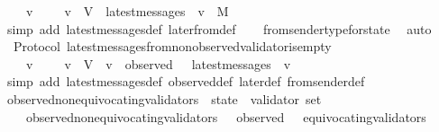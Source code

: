 \begin{isabellebody}
\ \ {\isachardoublequoteopen}{\isasymforall}\ {\isasymsigma}\ v{\isachardot}\ {\isasymsigma}\ {\isasymin}\ {\isasymSigma}\ {\isasymand}\ v\ {\isasymin}\ V\ {\isasymlongrightarrow}\ latest{\isacharunderscore}messages\ {\isasymsigma}\ v\ {\isasymsubseteq}\ M{\isachardoublequoteclose}\isanewline
%
\isadelimproof
\ \ %
\endisadelimproof
%
\isatagproof
{}\isamarkupfalse%
\ {\isacharparenleft}simp\ add{\isacharcolon}\ latest{\isacharunderscore}messages{\isacharunderscore}def\ later{\isacharunderscore}from{\isacharunderscore}def{\isacharparenright}\isanewline
\ \ \isamarkupfalse%
\ from{\isacharunderscore}sender{\isacharunderscore}type{\isacharunderscore}for{\isacharunderscore}state\ \isamarkupfalse%
\ auto%
\endisatagproof
{\isafoldproof}%
%
\isadelimproof
\isanewline
%
\endisadelimproof
\isanewline
{}\isamarkupfalse%
\ {\isacharparenleft}\ Protocol{\isacharparenright}\ latest{\isacharunderscore}messages{\isacharunderscore}from{\isacharunderscore}non{\isacharunderscore}observed{\isacharunderscore}validator{\isacharunderscore}is{\isacharunderscore}empty\ {\isacharcolon}\isanewline
\ \ {\isachardoublequoteopen}{\isasymforall}\ {\isasymsigma}\ v{\isachardot}\ {\isasymsigma}\ {\isasymin}\ {\isasymSigma}\ {\isasymand}\ v\ {\isasymin}\ V\ {\isasymand}\ v\ {\isasymnotin}\ observed\ {\isasymsigma}\ {\isasymlongrightarrow}\ latest{\isacharunderscore}messages\ {\isasymsigma}\ v\ {\isacharequal}\ {\isasymemptyset}{\isachardoublequoteclose}\isanewline
%
\isadelimproof
\ \ %
\endisadelimproof
%
\isatagproof
{}\isamarkupfalse%
\ {\isacharparenleft}simp\ add{\isacharcolon}\ latest{\isacharunderscore}messages{\isacharunderscore}def\ observed{\isacharunderscore}def\ later{\isacharunderscore}def\ from{\isacharunderscore}sender{\isacharunderscore}def{\isacharparenright}%
\endisatagproof
{\isafoldproof}%
%
\isadelimproof
\isanewline
%
\endisadelimproof
\isanewline
\isanewline
{}\isamarkupfalse%
\ observed{\isacharunderscore}non{\isacharunderscore}equivocating{\isacharunderscore}validators\ {\isacharcolon}{\isacharcolon}\ {\isachardoublequoteopen}state\ {\isasymRightarrow}\ validator\ set{\isachardoublequoteclose}\isanewline
\ \ \isanewline
\ \ \ \ {\isachardoublequoteopen}observed{\isacharunderscore}non{\isacharunderscore}equivocating{\isacharunderscore}validators\ {\isasymsigma}\ {\isacharequal}\ observed\ {\isasymsigma}\ {\isacharminus}\ equivocating{\isacharunderscore}validators\ {\isasymsigma}{\isachardoublequoteclose}\isanewline
\isanewline
{}\isamarkupfalse%

\end{isabellebody}
